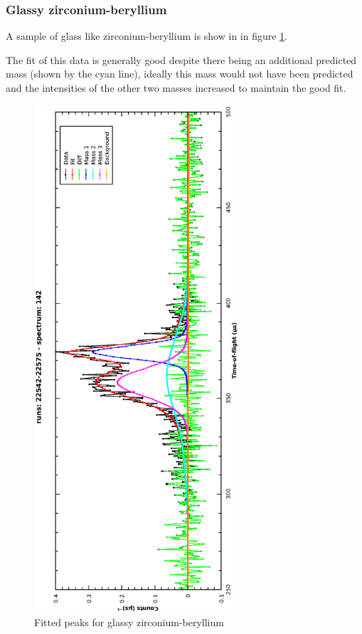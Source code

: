 \documentclass[a4paper]{article}
\begin{document}
\subsubsection{Glassy zirconium-beryllium}

A sample of glass like zirconium-beryllium is show in in figure
\ref{fig:model_sel_glassy-zrbe}.

The fit of this data is generally good despite there being an additional
predicted mass (shown by the cyan line), ideally this mass would not have been
predicted and the intensities of the other two masses increased to maintain the
good fit.

\begin{figure}[h!]
  \centering
  \vspace{-60pt}
  \begin{turn}{-90}
    \includegraphics[width=0.68\textwidth]{graphics/model_sel_glassy-zrbe.eps}
  \end{turn}
  \vspace{-60pt}
  \caption{Fitted peaks for glassy zirconium-beryllium}
  \label{fig:model_sel_glassy-zrbe}
\end{figure}
\FloatBarrier
\end{document}
